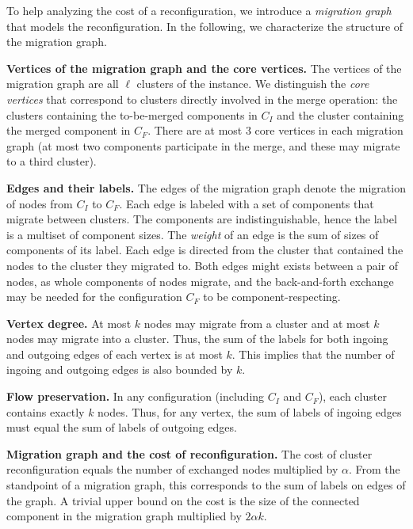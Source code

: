 \documentclass[a4paper,anonymous,USenglish]{lipics-v2019}
\begin{document}
To help analyzing the cost of a reconfiguration, we introduce a \emph{migration graph} that models the reconfiguration.
In the following, we characterize the structure of the migration graph.

\noindent
\textbf{Vertices of the migration graph and the core vertices.}
The vertices of the migration graph are all $\ell$ clusters of the instance.
We distinguish the \emph{core vertices} that correspond to clusters directly involved in the merge operation: the clusters containing the to-be-merged components in $C_I$ and the cluster containing the merged component in $C_F$.
There are at most $3$ core vertices in each migration graph (at most two components participate in the merge, and these may migrate to a third cluster).

\noindent
\textbf{Edges and their labels.}
The edges of the migration graph denote the migration of nodes from $C_I$ to $C_F$.
Each edge is labeled with a set of components that migrate between clusters.
The components are indistinguishable, hence the label is a multiset of component
sizes.
The \emph{weight} of an edge is the sum of sizes of components of its label.
Each edge is directed from the cluster that contained the nodes to the cluster they migrated to.
Both edges might exists between a pair of nodes, as whole components of nodes migrate, and the back-and-forth exchange may be needed for the configuration $C_F$ to be component-respecting.

\noindent
\textbf{Vertex degree.}
At most $k$ nodes may migrate from a cluster and at most $k$ nodes may migrate into a cluster.
Thus, the sum of the labels for both ingoing and outgoing edges of each vertex is at most $k$.
This implies that the number of ingoing and outgoing edges is also bounded by $k$.

\noindent
\textbf{Flow preservation.}
In any configuration (including $C_I$ and $C_F$), each cluster contains exactly $k$ nodes.
Thus, for any vertex, the sum of labels of ingoing edges must equal the sum of labels of outgoing edges.

\noindent
\textbf{Migration graph and the cost of reconfiguration.}
The cost of cluster reconfiguration equals the number of exchanged nodes multiplied by $\alpha$.
From the standpoint of a migration graph, this corresponds to the sum of labels on edges of the graph.
A trivial upper bound on the cost is the size of the connected component in the migration graph multiplied by $2\alpha k$.

\medskip
\end{document}
